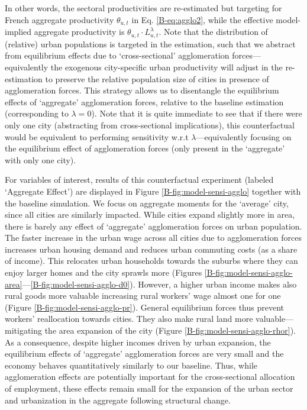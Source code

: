 \documentclass[11pt]{report}
\begin{document}
In other words, the sectoral productivities are re-estimated but targeting for French aggregate productivity $\theta_{u,t}$ in Eq. \eqref{B-eq:agglo2}, while the effective model-implied aggregate productivity is $\theta_{u,t}\cdot L_{u,t}^{\lambda}$. Note that the distribution of (relative) urban populations is targeted in the estimation, such that we abstract from equilibrium effects due to `cross-sectional' agglomeration forces---equivalently the exogenous city-specific urban productivity will adjust in the re-estimation to preserve the relative population size of cities in presence of agglomeration forces. This strategy allows us to disentangle the equilibrium effects of `aggregate' agglomeration forces, relative to the baseline estimation (corresponding to $\lambda=0$). Note that it is quite immediate to see that if there were only one city (abstracting from cross-sectional implications), this counterfactual would be equivalent to performing sensitivity w.r.t $\lambda$---equivalently focusing on the equilibrium effect of agglomeration forces (only present in the `aggregate' with only one city).

For variables of interest, results of this counterfactual experiment (labeled `Aggregate Effect') are displayed in Figure \ref{B-fig:model-sensi-agglo} together with the baseline simulation. We focus on aggregate moments for the `average' city, since all cities are similarly impacted. While cities expand slightly more in area, there is barely any effect of `aggregate' agglomeration forces on urban population. The faster increase in the urban wage across all cities due to agglomeration forces increases urban housing demand and reduces urban commuting costs (as a share of income). This relocates urban households towards the suburbs where they can enjoy larger homes and the city sprawls more (Figures \ref{B-fig:model-sensi-agglo-area}---\ref{B-fig:model-sensi-agglo-d0}). However, a higher urban income makes also rural goods more valuable increasing rural workers' wage almost one for one (Figure \ref{B-fig:model-sensi-agglo-pr}). General equilibrium forces thus prevent workers' reallocation towards cities. They also make rural land more valuable---mitigating the area expansion of the city (Figure \ref{B-fig:model-sensi-agglo-rhor}). As a consequence, despite higher incomes driven by urban expansion, the equilibrium effects of `aggregate' agglomeration forces are very small and the economy behaves quantitatively similarly to our baseline. Thus, while agglomeration effects are potentially important for the cross-sectional allocation of employment, these effects remain small for the expansion of the urban sector and urbanization in the aggregate following structural change. 
\end{document}
